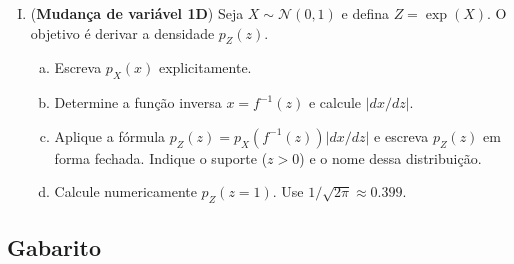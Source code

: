 \documentclass{dlproblemset}
\begin{document}
\begin{enumerate}[I)]
    \item {} (\textbf{Mudança de variável 1D}) Seja $X \sim \mathcal{N}(0,1)$ e defina $Z = \exp(X)$. O objetivo é derivar a densidade $p_Z(z)$.
    \begin{enumerate}[(a)]
        \item Escreva $p_X(x)$ explicitamente.
        \item Determine a função inversa $x = f^{-1}(z)$ e calcule $\left|d x / d z\right|$.
        \item Aplique a fórmula $p_Z(z) = p_X(f^{-1}(z)) \left|d x / d z\right|$ e escreva $p_Z(z)$ em forma fechada. Indique o suporte ($z > 0$) e o nome dessa distribuição.
        \item Calcule numericamente $p_Z(z = 1)$. Use $1/\sqrt{2\pi} \approx 0.399$.
    \end{enumerate}

\end{enumerate}

\subsection*{Gabarito}
\color{blue}
\end{document}
